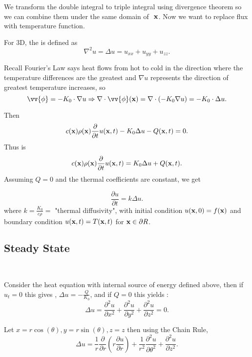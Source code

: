 \documentclass[class=article,crop=false]{standalone}
\begin{document}
\begin{intuition}
	We transform the double integral to triple integral using divergence theorem so we can combine them under the same domain of $ {\boldmath\textbf{ x}} $. Now we want to replace flux with temperature function.
\end{intuition}

\begin{defn}[Laplacian]
For 3D, the  is defined as 
	\[
\nabla ^2 u = \Delta u = u_{xx}+u_{yy}+u_{zz}
.\] 
\end{defn}


Recall Fourier's Law says heat flows from hot to cold in the direction where the temperature differences are the greatest and $ \nabla u$ represents the direction of greatest temperature increases, so
\[
	\vv{ \phi}=-K_0 \cdot  \nabla u \implies \nabla \cdot \vv{ \phi}( \allbold{x} ) = \nabla \cdot (-K_0 \nabla u) = -K_0 \cdot \Delta u
.\] 

Then
\[
	c( {\boldmath\textbf{x}} )\rho ( {\boldmath\textbf{x}}) \frac{\partial }{\partial t} u( {\boldmath\textbf{x}},t ) -K_0 \Delta u - Q( {\boldmath\textbf{x}},t )=0
.\] 
Thus  is
\[
	c( {\boldmath\textbf{x}} )\rho ( {\boldmath\textbf{x}}) \frac{\partial }{\partial t} u( {\boldmath\textbf{x}},t ) =K_0 \Delta u + Q( {\boldmath\textbf{x}},t )
.\] 
Assuming $ Q=0$ and the thermal coefficients are constant, we get
\begin{thm}
 \[
\frac{\partial u}{\partial t} = k \Delta u 
.\] 
where $k=\frac{K_0}{c \rho}= $ "thermal diffusivity", with initial condition $ u( {\boldmath\textbf{x}},0 )= f ( {\boldmath\textbf{x}} )$ and boundary condition $ u( {\boldmath\textbf{x}} ,t)= T( {\boldmath\textbf{x}},t )$ for $ {\boldmath\textbf{x}} \in \partial R $.
\end{thm}
\subsection{Steady State}

~\begin{thm}
Consider the heat equation with internal source of energy defined above, then if $ u_t=0$ this gives  , $ \Delta u = -\frac{Q}{K_0}$, and if $ Q=0$ this yields  :
\[
\Delta u = \frac{\partial^2 u}{\partial { x}^2} + \frac{\partial^2 u}{\partial { y}^2} + \frac{\partial^2 u}{\partial { z}^2} =0
.\] 
\end{thm}

\begin{thm}
Let $  x= r \cos(\theta ), y=r \sin(\theta ), z=z$ then using the Chain Rule, 
\[
	\Delta u = \frac{1}{r} \frac{\partial }{\partial r} \left( r \frac{\partial u}{\partial r}  \right) + \frac{1}{r^2} \frac{\partial^2 u}{\partial { \theta}^2}  + \frac{\partial^2 u}{\partial { z}^2} 
.\] 
\end{thm}
\end{document}
